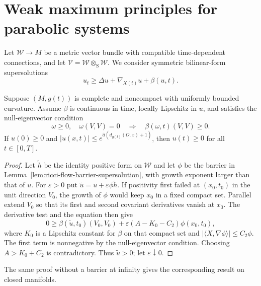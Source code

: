 \section{Weak maximum principles for parabolic systems}

Let $\mathcal W\to M$ be a metric vector bundle with compatible
time-dependent connections, and let
$\mathcal V=\mathcal W\otimes_{\mathrm S}\mathcal W$.  We consider symmetric
bilinear-form supersolutions
\[
u_t\geq\Delta u+\nabla_{X(t)}u+\beta(u,t).
\]

\begin{proposition}
\label{prop:noncompact-system-preserves-nonnegativity}
Suppose $(M,g(t))$ is complete and noncompact with uniformly bounded
curvature.  Assume $\beta$ is continuous in time, locally Lipschitz in $u$,
and satisfies the null-eigenvector condition
\[
\omega\geq0,\quad \omega(V,V)=0
\quad\Longrightarrow\quad \beta(\omega,t)(V,V)\geq0.
\]
If $u(0)\geq0$ and
$|u(x,t)|\leq e^{\widehat a(d_{g(t)}(O,x)+1)}$, then $u(t)\geq0$ for all
$t\in[0,T]$.
\end{proposition}

\begin{proof}
\sketch
{}
Let $\widetilde h$ be the identity positive form on $\mathcal W$ and let
$\phi$ be the barrier in Lemma~\ref{lem:ricci-flow-barrier-supersolution},
with growth exponent larger than that of $u$.  For $\varepsilon>0$ put
$\widetilde u=u+\varepsilon\phi\widetilde h$.  If positivity first failed at
$(x_0,t_0)$ in the unit direction $V_0$, the growth of $\phi$ would keep
$x_0$ in a fixed compact set.  Parallel extend $V_0$ so that its first and
second covariant derivatives vanish at $x_0$.  The derivative test and the
equation then give
\[
0\geq \beta(\widetilde u,t_0)(V_0,V_0)
+\varepsilon(A-K_0-C_2)\phi(x_0,t_0),
\]
where $K_0$ is a Lipschitz constant for $\beta$ on that compact set and
$|\langle X,\nabla\phi\rangle|\leq C_2\phi$.  The first term is nonnegative
by the null-eigenvector condition.  Choosing $A>K_0+C_2$ is contradictory.
Thus $\widetilde u>0$; let $\varepsilon\downarrow0$.
\end{proof}

\begin{remark}
\label{rem:system-wmp-closed-manifolds}
The same proof without a barrier at infinity gives the corresponding result
on closed manifolds.
\end{remark}

